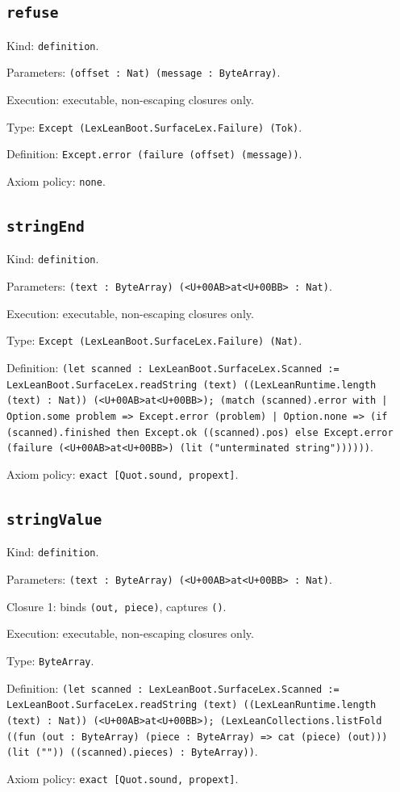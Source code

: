\documentclass[11pt]{article}
\begin{document}
\subsection*{\texttt{refuse}}
\noindent Kind: \texttt{definition}.\par
\noindent Parameters: \texttt{(offset : Nat) (message : ByteArray)}.\par
\noindent Execution: executable, non-escaping closures only.\par
\noindent Type: \texttt{Except (LexLeanBoot.SurfaceLex.Failure) (Tok)}.\par
\noindent Definition: \texttt{Except.error (failure (offset) (message))}.\par
\noindent Axiom policy: \texttt{none}.\par
\subsection*{\texttt{stringEnd}}
\noindent Kind: \texttt{definition}.\par
\noindent Parameters: \texttt{(text : ByteArray) (<U+00AB>at<U+00BB> : Nat)}.\par
\noindent Execution: executable, non-escaping closures only.\par
\noindent Type: \texttt{Except (LexLeanBoot.SurfaceLex.Failure) (Nat)}.\par
\noindent Definition: \texttt{(let scanned : LexLeanBoot.SurfaceLex.Scanned := LexLeanBoot.SurfaceLex.readString (text) ((LexLeanRuntime.length (text) : Nat)) (<U+00AB>at<U+00BB>); (match (scanned).error with | Option.some problem => Except.error (problem) | Option.none => (if (scanned).finished then Except.ok ((scanned).pos) else Except.error (failure (<U+00AB>at<U+00BB>) (lit ("unterminated string"))))))}.\par
\noindent Axiom policy: \texttt{exact [Quot.sound, propext]}.\par
\subsection*{\texttt{stringValue}}
\noindent Kind: \texttt{definition}.\par
\noindent Parameters: \texttt{(text : ByteArray) (<U+00AB>at<U+00BB> : Nat)}.\par
\noindent Closure 1: binds \texttt{(out, piece)}, captures \texttt{()}.\par
\noindent Execution: executable, non-escaping closures only.\par
\noindent Type: \texttt{ByteArray}.\par
\noindent Definition: \texttt{(let scanned : LexLeanBoot.SurfaceLex.Scanned := LexLeanBoot.SurfaceLex.readString (text) ((LexLeanRuntime.length (text) : Nat)) (<U+00AB>at<U+00BB>); (LexLeanCollections.listFold ((fun (out : ByteArray) (piece : ByteArray) => cat (piece) (out))) (lit ("")) ((scanned).pieces) : ByteArray))}.\par
\noindent Axiom policy: \texttt{exact [Quot.sound, propext]}.\par
\end{document}
